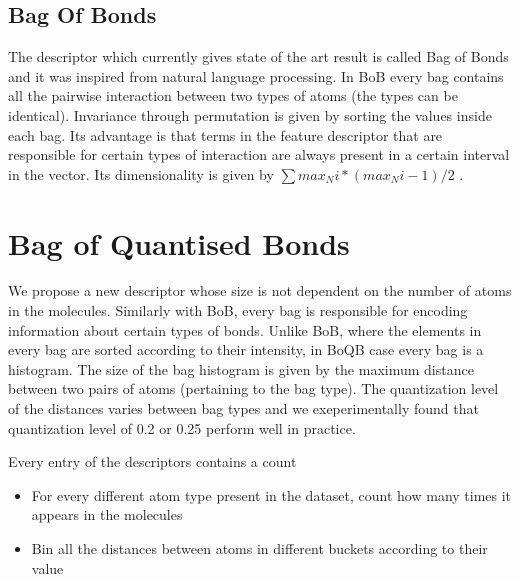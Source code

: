 \documentclass{article}
\begin{document}
\subsection{Bag Of Bonds}
The descriptor which currently gives state of the art result is called Bag of Bonds and it was inspired from natural language processing. In BoB every bag contains all the pairwise interaction between two types of atoms (the types can be identical).
Invariance through permutation is given by sorting the values inside each bag.
Its advantage is that terms in the feature descriptor that are responsible for certain types 
of interaction are always present in a certain interval in the vector.
Its dimensionality  is given by $\sum max_Ni*(max_Ni-1)/2$ .


\section{Bag of Quantised Bonds}
We propose a new descriptor whose size is not dependent on the number of atoms in the molecules. Similarly with BoB, every bag is responsible for encoding information about certain types of bonds. Unlike BoB, where the elements in every bag are sorted according to their intensity, in BoQB case every bag is a histogram.
The size of  the bag histogram is given by the maximum distance between two pairs
of atoms (pertaining to the bag type). The quantization level of the distances varies between bag types and we exeperimentally found that quantization level of 0.2 or 0.25 perform well in practice.

Every entry of the descriptors contains a count
\begin{itemize}
\item 
For every different atom type present in the dataset, count how many times it appears in the molecules
\item  
Bin all the distances between atoms in different buckets according to their value
\end{itemize}
\end{document}
